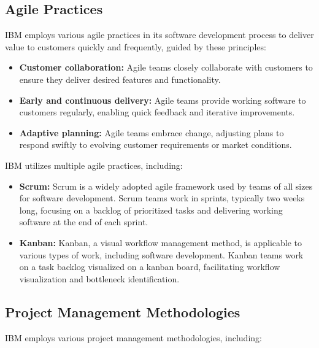 \subsection{Agile Practices}

IBM employs various agile practices in its software development process to deliver value to customers quickly and frequently, guided by these principles:

\begin{itemize}
    \item \textbf{Customer collaboration:} Agile teams closely collaborate with customers to ensure they deliver desired features and functionality.
    \item \textbf{Early and continuous delivery:} Agile teams provide working software to customers regularly, enabling quick feedback and iterative improvements.
    \item \textbf{Adaptive planning:} Agile teams embrace change, adjusting plans to respond swiftly to evolving customer requirements or market conditions.
\end{itemize}

IBM utilizes multiple agile practices, including:

\begin{itemize}
    \item \textbf{Scrum:} Scrum is a widely adopted agile framework used by teams of all sizes for software development. Scrum teams work in sprints, typically two weeks long, focusing on a backlog of prioritized tasks and delivering working software at the end of each sprint.
    \item \textbf{Kanban:} Kanban, a visual workflow management method, is applicable to various types of work, including software development. Kanban teams work on a task backlog visualized on a kanban board, facilitating workflow visualization and bottleneck identification.
\end{itemize}

\subsection{Project Management Methodologies}

IBM employs various project management methodologies, including:

